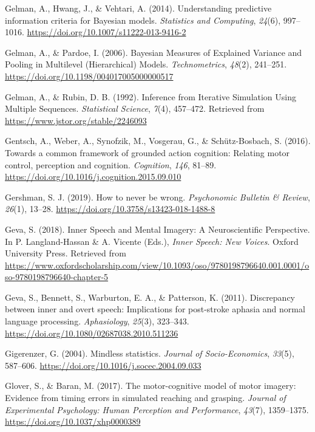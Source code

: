 \documentclass[a4paper,12pt,twoside,onecolumn,openright,final,oldfontcommands]{memoir}
\begin{document}
\leavevmode\hypertarget{ref-gelman_understanding_2014}{}%
Gelman, A., Hwang, J., \& Vehtari, A. (2014). Understanding predictive information criteria for Bayesian models. \emph{Statistics and Computing}, \emph{24}(6), 997--1016. \url{https://doi.org/10.1007/s11222-013-9416-2}

\leavevmode\hypertarget{ref-gelman_bayesian_2006}{}%
Gelman, A., \& Pardoe, I. (2006). Bayesian Measures of Explained Variance and Pooling in Multilevel (Hierarchical) Models. \emph{Technometrics}, \emph{48}(2), 241--251. \url{https://doi.org/10.1198/004017005000000517}

\leavevmode\hypertarget{ref-gelman_inference_1992}{}%
Gelman, A., \& Rubin, D. B. (1992). Inference from Iterative Simulation Using Multiple Sequences. \emph{Statistical Science}, \emph{7}(4), 457--472. Retrieved from \url{https://www.jstor.org/stable/2246093}

\leavevmode\hypertarget{ref-gentsch_towards_2016}{}%
Gentsch, A., Weber, A., Synofzik, M., Vosgerau, G., \& Schütz-Bosbach, S. (2016). Towards a common framework of grounded action cognition: Relating motor control, perception and cognition. \emph{Cognition}, \emph{146}, 81--89. \url{https://doi.org/10.1016/j.cognition.2015.09.010}

\leavevmode\hypertarget{ref-gershman_how_2019}{}%
Gershman, S. J. (2019). How to never be wrong. \emph{Psychonomic Bulletin \& Review}, \emph{26}(1), 13--28. \url{https://doi.org/10.3758/s13423-018-1488-8}

\leavevmode\hypertarget{ref-geva_inner_2018}{}%
Geva, S. (2018). Inner Speech and Mental Imagery: A Neuroscientific Perspective. In P. Langland-Hassan \& A. Vicente (Eds.), \emph{Inner Speech: New Voices}. Oxford University Press. Retrieved from \url{https://www.oxfordscholarship.com/view/10.1093/oso/9780198796640.001.0001/oso-9780198796640-chapter-5}

\leavevmode\hypertarget{ref-geva_discrepancy_2011}{}%
Geva, S., Bennett, S., Warburton, E. A., \& Patterson, K. (2011). Discrepancy between inner and overt speech: Implications for post-stroke aphasia and normal language processing. \emph{Aphasiology}, \emph{25}(3), 323--343. \url{https://doi.org/10.1080/02687038.2010.511236}

\leavevmode\hypertarget{ref-Gigerenzer2004}{}%
Gigerenzer, G. (2004). Mindless statistics. \emph{Journal of Socio-Economics}, \emph{33}(5), 587--606. \url{https://doi.org/10.1016/j.socec.2004.09.033}

\leavevmode\hypertarget{ref-glover_motor-cognitive_2017}{}%
Glover, S., \& Baran, M. (2017). The motor-cognitive model of motor imagery: Evidence from timing errors in simulated reaching and grasping. \emph{Journal of Experimental Psychology: Human Perception and Performance}, \emph{43}(7), 1359--1375. \url{https://doi.org/10.1037/xhp0000389}
\end{document}
